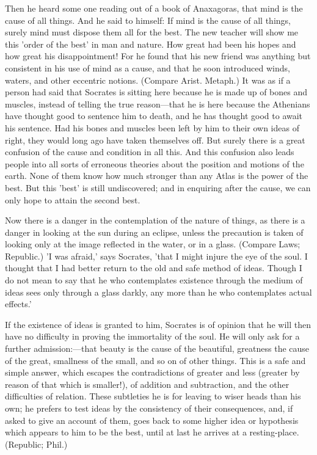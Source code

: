 Then he heard some one reading out of a book of Anaxagoras, that mind is
the cause of all things. And he said to himself: If mind is the cause of
all things, surely mind must dispose them all for the best. The new
teacher will show me this 'order of the best' in man and nature. How great
had been his hopes and how great his disappointment! For he found that his
new friend was anything but consistent in his use of mind as a cause, and
that he soon introduced winds, waters, and other eccentric notions.
(Compare Arist. Metaph.) It was as if a person had said that Socrates is
sitting here because he is made up of bones and muscles, instead of
telling the true reason—that he is here because the Athenians have
thought good to sentence him to death, and he has thought good to await
his sentence. Had his bones and muscles been left by him to their own
ideas of right, they would long ago have taken themselves off. But surely
there is a great confusion of the cause and condition in all this. And
this confusion also leads people into all sorts of erroneous theories
about the position and motions of the earth. None of them know how much
stronger than any Atlas is the power of the best. But this 'best' is still
undiscovered; and in enquiring after the cause, we can only hope to attain
the second best.

Now there is a danger in the contemplation of the nature of things, as
there is a danger in looking at the sun during an eclipse, unless the
precaution is taken of looking only at the image reflected in the water,
or in a glass. (Compare Laws; Republic.) 'I was afraid,' says Socrates,
'that I might injure the eye of the soul. I thought that I had better
return to the old and safe method of ideas. Though I do not mean to say
that he who contemplates existence through the medium of ideas sees only
through a glass darkly, any more than he who contemplates actual effects.'

If the existence of ideas is granted to him, Socrates is of opinion that
he will then have no difficulty in proving the immortality of the soul. He
will only ask for a further admission:—that beauty is the cause of
the beautiful, greatness the cause of the great, smallness of the small,
and so on of other things. This is a safe and simple answer, which escapes
the contradictions of greater and less (greater by reason of that which is
smaller!), of addition and subtraction, and the other difficulties of
relation. These subtleties he is for leaving to wiser heads than his own;
he prefers to test ideas by the consistency of their consequences, and, if
asked to give an account of them, goes back to some higher idea or
hypothesis which appears to him to be the best, until at last he arrives
at a resting-place. (Republic; Phil.)

